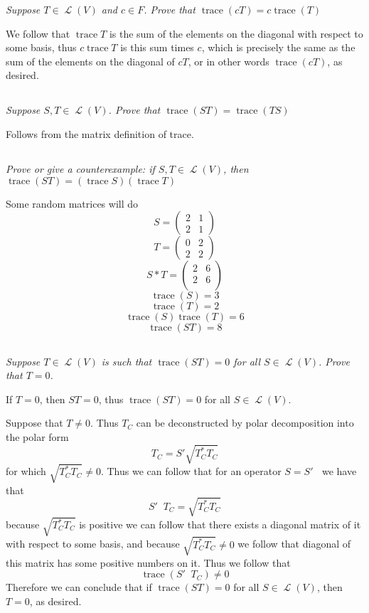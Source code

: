 \documentclass[11pt,oneside,titlepage]{book}
\DeclareMathOperator \map {\mathcal {L}}
\DeclareMathOperator \trace {trace}
\DeclareMathOperator \inv {^{-1}}
\begin{document}
\textit{Suppose $T \in \map(V)$ and $c \in F$. Prove that $\trace(cT) = c\trace(T)$}

We follow that $\trace T$ is the sum of the elements on the diagonal with respect to
some basis, thus $c \trace T$ is this sum times $c$, which is precisely the same
as the sum of the elements on the diagonal of $cT$, or in other words $\trace(cT)$,
as desired.

\subsection{}

\textit{Suppose $S, T \in \map(V)$. Prove that $\trace(ST) = \trace(TS)$}

Follows from the matrix definition of trace.

\subsection{}

\textit{Prove or give a counterexample: if $S, T \in \map(V)$, then
  $\trace(ST) = (\trace S)(\trace T)$}

Some random matrices will do
$$S =
\begin{pmatrix}
  2 & 1 \\
  2 & 1
\end{pmatrix}
$$
$$T =
\begin{pmatrix}
  0 & 2 \\
  2 & 2
\end{pmatrix}
$$
$$S * T =
\begin{pmatrix}
  2 & 6 \\
  2 & 6 \\
\end{pmatrix}
$$
$$\trace(S) = 3$$
$$\trace(T) = 2$$
$$\trace(S)\trace(T) = 6$$
$$\trace(ST) = 8$$

\subsection{}

\textit{Suppose $T \in \map(V)$ is such that $\trace(ST) = 0$ for all $S \in \map(V)$. Prove that
  $T = 0$.}

If $T = 0$, then $ST = 0$, thus $\trace(ST) = 0$ for all $S \in \map(V)$.

Suppose that $T \neq 0$. Thus $T_C$ can be deconstructed by polar decomposition into the
polar form
$$T_C = S' \sqrt{T_C^* T_C}$$
for which $\sqrt{T_C^* T_C} \neq 0$. Thus we can follow that for an operator $S = S'\inv$ we have that
$$S'\inv T_C = \sqrt{T_C^* T_C}$$
because $\sqrt{T_C^* T_C}$ is positive we can follow that there exists a diagonal matrix of
it with respect to some basis, and because $\sqrt{T_C^* T_C} \neq 0$ we follow that
diagonal of this matrix has some positive numbers on it. Thus we follow that
$$\trace(S'\inv T_C ) \neq 0$$
Therefore we can conclude that if $\trace(ST) = 0$ for all $S \in \map(V)$, then $T = 0$, as desired.
\end{document}
